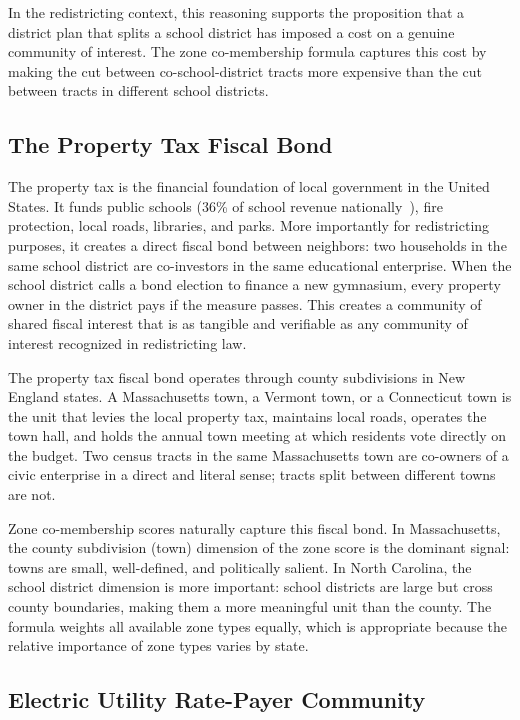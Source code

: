 In the redistricting context, this reasoning supports the proposition that a district
plan that splits a school district has imposed a cost on a genuine community of
interest.
The zone co-membership formula captures this cost by making the cut between
co-school-district tracts more expensive than the cut between tracts in different
school districts.

\subsection{The Property Tax Fiscal Bond}

The property tax is the financial foundation of local government in the United States.
It funds public schools (36\% of school revenue nationally~\citep{nces2022}),
fire protection, local roads, libraries, and parks.
More importantly for redistricting purposes, it creates a direct fiscal bond between
neighbors: two households in the same school district are co-investors in the same
educational enterprise.
When the school district calls a bond election to finance a new gymnasium, every
property owner in the district pays if the measure passes.
This creates a community of shared fiscal interest that is as tangible and verifiable
as any community of interest recognized in redistricting law.

The property tax fiscal bond operates through county subdivisions in New England states.
A Massachusetts town, a Vermont town, or a Connecticut town is the unit that levies
the local property tax, maintains local roads, operates the town hall, and holds
the annual town meeting at which residents vote directly on the budget.
Two census tracts in the same Massachusetts town are co-owners of a civic enterprise
in a direct and literal sense; tracts split between different towns are not.

Zone co-membership scores naturally capture this fiscal bond.
In Massachusetts, the county subdivision (town) dimension of the zone score is the
dominant signal: towns are small, well-defined, and politically salient.
In North Carolina, the school district dimension is more important: school districts
are large but cross county boundaries, making them a more meaningful unit than the
county.
The formula weights all available zone types equally, which is appropriate because
the relative importance of zone types varies by state.

\subsection{Electric Utility Rate-Payer Community}

